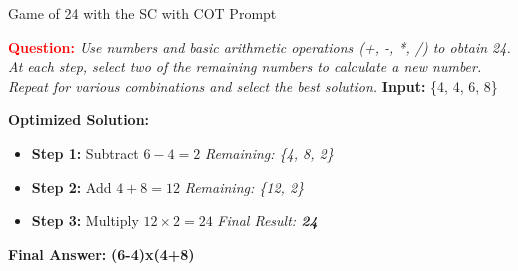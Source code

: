\documentclass[aspectratio=169, xcolor={dvipsnames}, 10pt, brazil]{beamer}
\begin{document}
\begin{frame}{Game of 24 with the SC with COT Prompt}
    \begin{tcolorbox}[
        colback=blue!5!white, 
        colframe=blue!80!black, 
        title=\textbf{\textcolor{white}{Prompt }}, 
        fonttitle=\bfseries\scriptsize, 
        coltitle=white, 
        boxrule=0.75mm, 
        rounded corners, 
        width=\textwidth-1.5cm, 
        enlarge left by=0.75cm, 
        enhanced
    ]
        \scriptsize
        \textbf{\textcolor{red}{Question:}}  
        \textit{Use numbers and basic arithmetic operations (+, -, *, /) to obtain 24. At each step, select two of the remaining numbers to calculate a new number. Repeat for various combinations and select the best solution.}  
        \hfill \textbf{Input:} \{4, 4, 6, 8\}

        \vspace{0.3cm}
        
        \textbf{\textcolor{green!50!black}{Optimized Solution:}}  
        \begin{itemize}
            \item \textbf{\textcolor{blue!70!black}{Step 1:}} Subtract \(6- 4 = 2\) \hfill \textit{Remaining: \{4, 8, 2\}}
            \item \textbf{\textcolor{blue!70!black}{Step 2:}} Add \(4 + 8 = 12\) \hfill \textit{Remaining: \{12, 2\}}
            \item \textbf{\textcolor{blue!70!black}{Step 3:}} Multiply \(12 \times 2 = 24\) 
           \hfill \textit{Final Result: \textbf{24}}
        \end{itemize}
        
        \vspace{0.3cm}
        \begin{center}
            \begin{tcolorbox}[sharp corners=south, coltitle=black]
                \textbf{\small Final Answer:} \textbf{\huge (6-4)x(4+8)}
            \end{tcolorbox}
        \end{center}

    \end{tcolorbox}
\end{frame}
\end{document}
